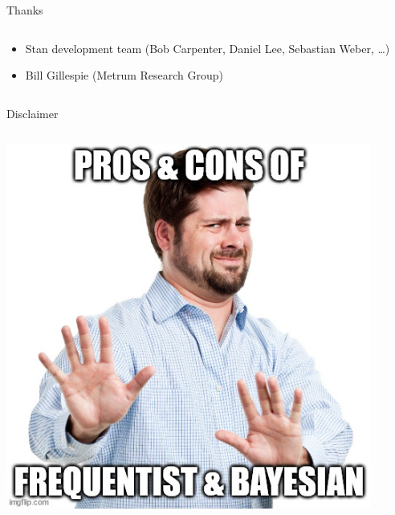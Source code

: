 \documentclass[bigger]{beamer}
\begin{document}
\begin{frame}[label={sec:orgd9ad60f}]{Thanks}
\begin{columns}
\begin{column}{0.5\columnwidth}
\begin{itemize}
\item Stan development team (Bob Carpenter, Daniel Lee, Sebastian Weber, \ldots{})
\item Bill Gillespie (Metrum Research Group)
\end{itemize}
\end{column}
\end{columns}
\end{frame}


\begin{frame}[label={sec:orge88ba54}]{Disclaimer}
\begin{columns}
\begin{column}{0.33\columnwidth}
\begin{center}
\includegraphics[width=0.9\textwidth]{./figure/dont_want_2.jpg}
\end{center}
\end{column}



\end{columns}
\end{frame}
\end{document}
